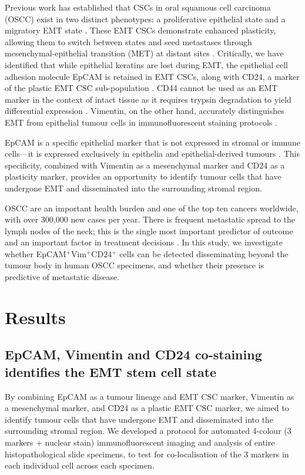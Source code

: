 \documentclass[11pt]{article}
\begin{document}
Previous work has established that CSCs in oral squamous cell carcinoma (OSCC) exist in two distinct phenotypes: a proliferative epithelial state and a migratory EMT state \citep{biddle2011}. These EMT CSCs demonstrate enhanced plasticity, allowing them to switch between states and seed metastases through mesenchymal-epithelial transition (MET) at distant sites \citep{biddle2016, ocana2012, tsai2012}. Critically, we have identified that while epithelial keratins are lost during EMT, the epithelial cell adhesion molecule EpCAM is retained in EMT CSCs, along with CD24, a marker of the plastic EMT CSC sub-population \citep{biddle2016}. CD44 cannot be used as an EMT marker in the context of intact tissue as it requires trypsin degradation to yield differential expression \citep{biddle2013, mack2008}. Vimentin, on the other hand, accurately distinguishes EMT from epithelial tumour cells in immunofluorescent staining protocols \citep{biddle2016}.

EpCAM is a specific epithelial marker that is not expressed in stromal or immune cells---it is expressed exclusively in epithelia and epithelial-derived tumours \citep{keller2019}. This specificity, combined with Vimentin as a mesenchymal marker and CD24 as a plasticity marker, provides an opportunity to identify tumour cells that have undergone EMT and disseminated into the surrounding stromal region.

OSCC are an important health burden and one of the top ten cancers worldwide, with over 300,000 new cases per year. There is frequent metastatic spread to the lymph nodes of the neck; this is the single most important predictor of outcome and an important factor in treatment decisions \citep{sano2007}. In this study, we investigate whether EpCAM$^+$Vim$^+$CD24$^+$ cells can be detected disseminating beyond the tumour body in human OSCC specimens, and whether their presence is predictive of metastatic disease.

\section{Results}

\subsection{EpCAM, Vimentin and CD24 co-staining identifies the EMT stem cell state}

By combining EpCAM as a tumour lineage and EMT CSC marker, Vimentin as a mesenchymal marker, and CD24 as a plastic EMT CSC marker, we aimed to identify tumour cells that have undergone EMT and disseminated into the surrounding stromal region. We developed a protocol for automated 4-colour (3 markers + nuclear stain) immunofluorescent imaging and analysis of entire histopathological slide specimens, to test for co-localisation of the 3 markers in each individual cell across each specimen.
\end{document}
